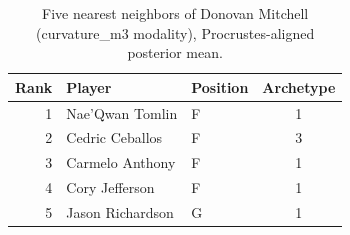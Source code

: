 \begin{table}[htbp]
  \centering\small
  \begin{tabular}{rllc}
    \toprule
    Rank & Player & Position & Archetype \\
    \midrule
    1 & Nae'Qwan Tomlin & F & 1 \\
    2 & Cedric Ceballos & F & 3 \\
    3 & Carmelo Anthony & F & 1 \\
    4 & Cory Jefferson & F & 1 \\
    5 & Jason Richardson & G & 1 \\
    \bottomrule
  \end{tabular}
  \caption{Five nearest neighbors of Donovan Mitchell (curvature_m3 modality), Procrustes-aligned posterior mean.}
  \label{tab:Donovan_Mitchell_neighbors_curvature_m3}
\end{table}


